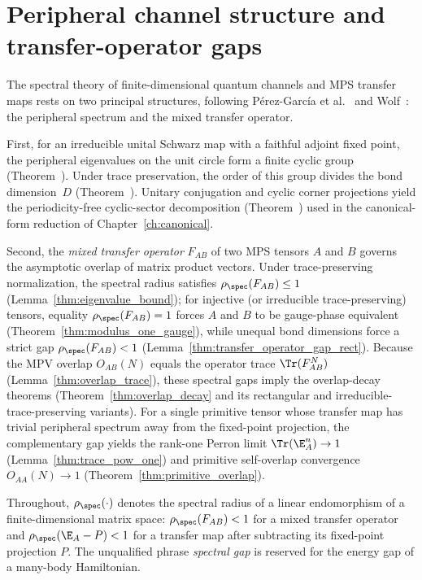 \chapter{Peripheral channel structure and transfer-operator gaps}\label{ch:spectral}

The spectral theory of finite-dimensional quantum channels and MPS transfer maps
rests on two principal structures, following Pérez-García et
al.~\cite{PerezGarcia2007Matrix} and Wolf~\cite{Wolf2012Quantum}: the peripheral
spectrum and the mixed transfer operator.

First, for an irreducible unital Schwarz map with a faithful adjoint fixed
point, the peripheral eigenvalues on the unit circle form a finite cyclic group
(Theorem~\cite[``Peripheral eigenvalues: cyclic structure for Kraus
    maps'']{QICLean2026Blueprint}). Under trace preservation, the order of this
group divides the bond dimension~$D$ (Theorem~\cite[``Transfer-map peripheral
    eigenvalues form a cyclic group'']{QICLean2026Blueprint}). Unitary
conjugation and cyclic corner projections yield the periodicity-free
cyclic-sector decomposition (Theorem~\cite[``Cyclic decomposition for
    irreducible finite Kraus maps'']{QICLean2026Blueprint}) used in the
canonical-form reduction of Chapter~\ref{ch:canonical}.

Second, the \emph{mixed transfer operator} $F_{AB}$ of two MPS tensors $A$ and
$B$ governs the asymptotic overlap of matrix product vectors. Under
trace-preserving normalization, the spectral radius satisfies
$\rho_{\spec}(F_{AB})\leq1$ (Lemma~\ref{thm:eigenvalue_bound}); for injective
(or irreducible trace-preserving) tensors, equality $\rho_{\spec}(F_{AB})=1$
forces $A$ and $B$ to be gauge-phase equivalent
(Theorem~\ref{thm:modulus_one_gauge}), while unequal bond dimensions force a
strict gap $\rho_{\spec}(F_{AB})<1$
(Lemma~\ref{thm:transfer_operator_gap_rect}). Because the MPV overlap
$O_{AB}(N)$ equals the operator trace $\Tr(F_{AB}^N)$
(Lemma~\ref{thm:overlap_trace}), these spectral gaps imply the overlap-decay
theorems (Theorem~\ref{thm:overlap_decay} and its rectangular and
irreducible-trace-preserving variants). For a single primitive tensor whose
transfer map has trivial peripheral spectrum away from the fixed-point
projection, the complementary gap yields the rank-one Perron limit
$\Tr(\E_A^n)\to1$ (Lemma~\ref{thm:trace_pow_one}) and primitive self-overlap
convergence $O_{AA}(N)\to1$ (Theorem~\ref{thm:primitive_overlap}).

Throughout, $\rho_{\spec}(\cdot)$ denotes the spectral radius of a linear
endomorphism of a finite-dimensional matrix space: $\rho_{\spec}(F_{AB})<1$ for
a mixed transfer operator and $\rho_{\spec}(\E_A-P)<1$ for a transfer map after
subtracting its fixed-point projection $P$. The unqualified phrase \emph{spectral
    gap} is reserved for the energy gap of a many-body Hamiltonian.

